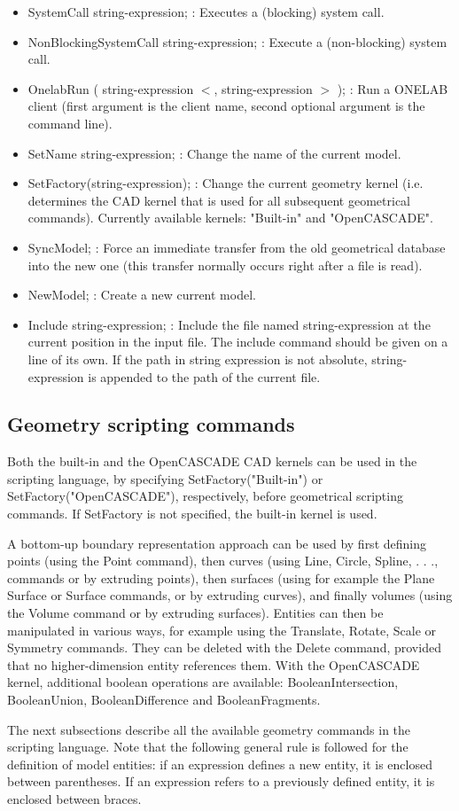 \documentclass[dvipdfmx, 9pt, a4paper]{article}
\numberwithin{equation}{section}
\begin{document}
\begin{itemize}
\item SystemCall string-expression; : Executes a (blocking) system call.
\item NonBlockingSystemCall string-expression; : Execute a (non-blocking) system call.
\item OnelabRun ( string-expression $<$, string-expression $>$ ); : Run a ONELAB client (first argument is the client name, second optional argument is the command line).
\item SetName string-expression; : Change the name of the current model.
\item SetFactory(string-expression); : Change the current geometry kernel (i.e. determines the CAD kernel that is used for all subsequent geometrical commands). Currently available kernels: "Built-in" and "OpenCASCADE".
\item SyncModel; : Force an immediate transfer from the old geometrical database into the new one (this transfer normally occurs right after a file is read).
\item NewModel; : Create a new current model.
\item Include string-expression; : Include the file named string-expression at the current position in the input file. The include command should be given on a line of its own. If the path in string expression is not absolute, string-expression is appended to the path of the current file.
\end{itemize}

\subsection{Geometry scripting commands}
Both the built-in and the OpenCASCADE CAD kernels can be used in the scripting language, by specifying SetFactory("Built-in") or SetFactory("OpenCASCADE"), respectively, before geometrical scripting commands. If SetFactory is not specified, the built-in kernel is used.\par
A bottom-up boundary representation approach can be used by first defining points (using the Point command), then curves (using Line, Circle, Spline, . . ., commands or by extruding points), then surfaces (using for example the Plane Surface or Surface commands, or by
extruding curves), and finally volumes (using the Volume command or by extruding surfaces). Entities can then be manipulated in various ways, for example using the Translate, Rotate, Scale or Symmetry commands. They can be deleted with the Delete command, provided
that no higher-dimension entity references them. With the OpenCASCADE kernel, additional boolean operations are available: BooleanIntersection, BooleanUnion, BooleanDifference and BooleanFragments.\par
The next subsections describe all the available geometry commands in the scripting language. Note that the following general rule is followed for the definition of model entities: if an expression defines a new entity, it is enclosed between parentheses. If an expression refers to a previously defined entity, it is enclosed between braces.
\end{document}

